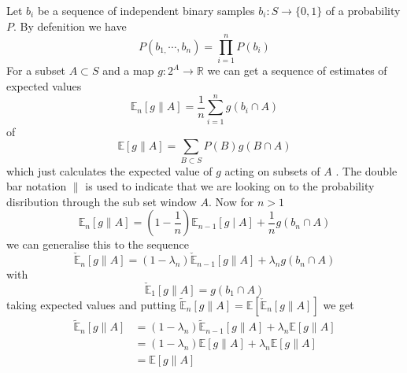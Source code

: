 \documentclass[a4paper,oneside,english]{article}
\numberwithin{equation}{section}
\numberwithin{figure}{section}
\begin{document}
Let $b_{i}$ be a sequence of independent binary samples $b_{i}:S\rightarrow\{0,1\}$
of a probability $P$. By defenition we have 
\[
P(b_{1,}\cdots,b_{n})=\prod_{i=1}^{n}P(b_{i})
\]
For a subset $A\subset S$ and a map $g:2^{A}\rightarrow\mathbb{R}$
we can get a sequence of estimates of expected values
\[
\mathbb{E}_{n}[g\parallel A]=\frac{1}{n}\sum_{i=1}^{n}g(b_{i}\cap A)
\]
of 
\[
\mathbb{E}[g\parallel A]=\sum_{B\subset S}P(B)g(B\cap A)
\]
which just calculates the expected value of $g$ acting on subsets
of $A$ . The double bar notation $\parallel$ is used to indicate
that we are looking on to the probability disribution through the
sub set window $A$. Now for $n>1$ 
\[
\mathbb{E}_{n}[g\parallel A]=\left(1-\frac{1}{n}\right)\mathbb{E}_{n-1}[g\mid A]+\frac{1}{n}g(b_{n}\cap A)
\]
we can generalise this to the sequence 
\[
\check{\mathbb{E}}_{n}[g\parallel A]=\left(1-\lambda_{n}\right)\mathbb{\check{E}}_{n-1}[g\parallel A]+\lambda_{n}g(b_{n}\cap A)
\]
with 
\[
\check{\mathbb{E}}_{1}[g\parallel A]=g(b_{1}\cap A)
\]
taking expected values and putting $\mathbb{\tilde{E}}_{n}[g\parallel A]=\mathbb{E}\left[\check{\mathbb{E}}_{n}[g\parallel A]\right]$
we get
\begin{align}
\mathbb{\tilde{E}}_{n}[g\parallel A] & = (1-\lambda_{n})\mathbb{\tilde{E}}_{n-1}[g\parallel A]+\lambda_{n}\mathbb{E}[g\parallel A]\\
& = (1-\lambda_{n})\mathbb{\mathbb{E}}[g\parallel A]+\lambda_{n}\mathbb{E}[g\parallel A]\\
& = \mathbb{E}[g\parallel A]
\end{align}
\end{document}
